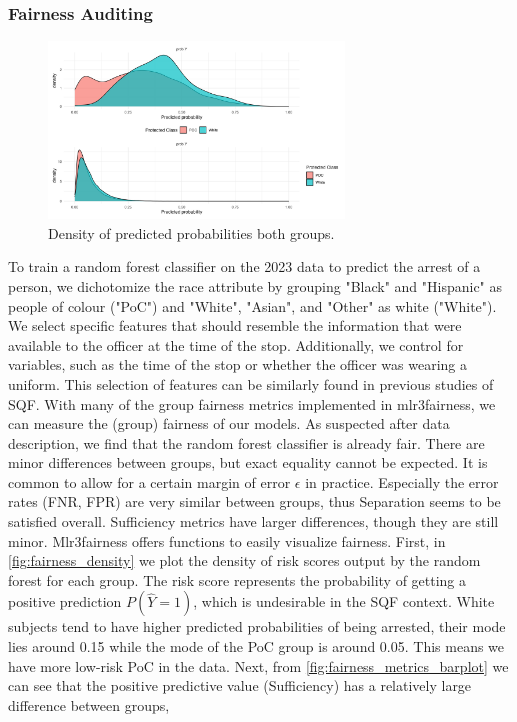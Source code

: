 \subsubsection*{Fairness Auditing}
\begin{figure}
    \centering
    \includegraphics[width=0.7\textwidth]{../figures/sqf_case_study_plot7.png}
    \caption{Density of predicted probabilities both groups.}
    \label{fig:fairness_density}
\end{figure}
To train a random forest classifier on the 2023 data to predict the arrest of a person, we dichotomize the race attribute by grouping "Black" and "Hispanic" as people of colour ("PoC") and "White", "Asian", and "Other" as white ("White").
We select specific features that should resemble the information that were available to the officer at the time of the stop. Additionally, we control for variables, such as the time of the stop or whether the officer was wearing a uniform. This selection of features can be similarly found in previous studies of SQF.
With many of the group fairness metrics implemented in mlr3fairness, we can measure the (group) fairness of our models.
As suspected after data description, we find that the random forest classifier is already fair. There are minor differences between groups, but exact equality cannot be expected. It is common to allow for a certain margin of error $\epsilon$ in practice.
Especially the error rates (FNR, FPR) are very similar between groups, thus Separation seems to be satisfied overall. Sufficiency metrics have larger differences, though they are still minor. Mlr3fairness offers functions to easily visualize fairness. First, in \autoref{fig:fairness_density} we plot the density of risk scores output by the random forest for each group.
The risk score represents the probability of getting a positive prediction $P(\hat{Y} = 1)$, which is undesirable in the SQF context. White subjects tend to have higher predicted probabilities of being arrested, their mode lies around 0.15 while the mode of the PoC group is around 0.05. This means we have more low-risk PoC in the data. Next, from \autoref{fig:fairness_metrics_barplot} we can see that the positive predictive value (Sufficiency) has a relatively large difference between groups,
